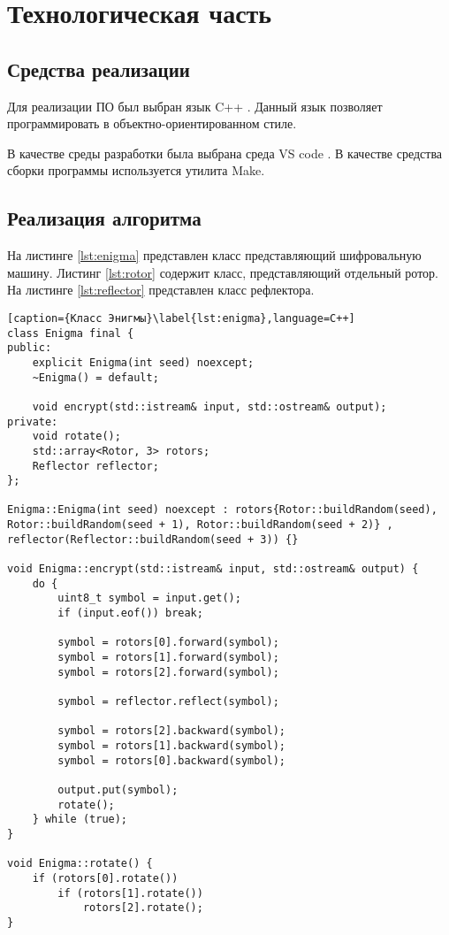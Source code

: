 
\chapter{Технологическая часть}

\section{Средства реализации}

Для реализации ПО был выбран язык C++ \cite{C++}.
Данный язык позволяет программировать в объектно-ориентированном стиле.

В качестве среды разработки была выбрана среда VS code \cite{vscode}.
В качестве средства сборки программы используется утилита Make.

\section{Реализация алгоритма}

На листинге \ref{lst:enigma} представлен класс представляющий шифровальную машину.
Листинг \ref{lst:rotor} содержит класс, представляющий отдельный ротор.
На листинге \ref{lst:reflector} представлен класс рефлектора.

\begin{lstlisting}[caption={Класс Энигмы}\label{lst:enigma},language=C++]
class Enigma final {
public:
    explicit Enigma(int seed) noexcept;
    ~Enigma() = default;

    void encrypt(std::istream& input, std::ostream& output);
private:
    void rotate();
    std::array<Rotor, 3> rotors;
    Reflector reflector;
};

Enigma::Enigma(int seed) noexcept : rotors{Rotor::buildRandom(seed), Rotor::buildRandom(seed + 1), Rotor::buildRandom(seed + 2)} , reflector(Reflector::buildRandom(seed + 3)) {}

void Enigma::encrypt(std::istream& input, std::ostream& output) {
    do {
        uint8_t symbol = input.get();
        if (input.eof()) break;

        symbol = rotors[0].forward(symbol);
        symbol = rotors[1].forward(symbol);
        symbol = rotors[2].forward(symbol);

        symbol = reflector.reflect(symbol);

        symbol = rotors[2].backward(symbol);
        symbol = rotors[1].backward(symbol);
        symbol = rotors[0].backward(symbol);

        output.put(symbol);
        rotate();
    } while (true);
}

void Enigma::rotate() {
    if (rotors[0].rotate())
        if (rotors[1].rotate())
            rotors[2].rotate();
}
\end{lstlisting}

